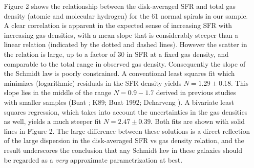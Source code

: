 Figure 2 shows the relationship between the disk-averaged SFR and
total gas density (atomic and molecular hydrogen)  
for the 61 normal spirals in our sample.  A clear correlation is apparent 
in the expected sense of increasing SFR with increasing gas densities, 
with a mean slope that is considerably steeper than a linear relation
(indicated by the dotted and dashed lines).
However the scatter in the relation is large, up to a 
factor of 30 in SFR at a fixed gas density, and comparable to the total 
range in observed gas density.  Consequently the slope of the Schmidt 
law is poorly constrained.   A conventional least squares fit 
which minimizes (logarithmic) residuals in the SFR density yields 
$N = 1.29 \pm 0.18$.
This slope lies in the middle of the range $N = 0.9 - 1.7$ derived in
previous studies with smaller samples 
(Buat ; K89; Buat 1992; Deharveng ).
A bivariate least squares regression, which takes into account the
uncertainties in the gas densities as well, yields a much steeper fit 
$N = 2.47 \pm 0.39$.  Both fits are shown with solid lines
in Figure 2.  The large difference between these solutions is a direct
reflection of the large dispersion in the disk-averaged SFR vs gas 
density relation, and the result underscores the conclusion that any 
Schmidt law in these galaxies should be regarded 
as a {\it very} approximate parametrization at best. 

